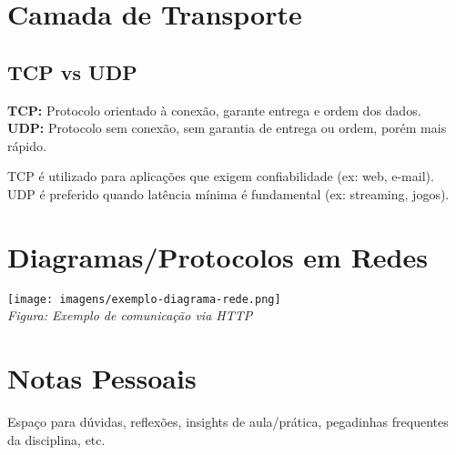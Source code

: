 \section{Camada de Transporte}
\subsection{TCP vs UDP}
\begin{defbox}
\textbf{TCP:} Protocolo orientado à conexão, garante entrega e ordem dos dados.\\
\textbf{UDP:} Protocolo sem conexão, sem garantia de entrega ou ordem, porém mais rápido.
\end{defbox}

\begin{notebox}
TCP é utilizado para aplicações que exigem confiabilidade (ex: web, e-mail). UDP é preferido quando latência mínima é fundamental (ex: streaming, jogos).
\end{notebox}

\section{Diagramas/Protocolos em Redes}
\begin{diagrambox}
\texttt{[image: imagens/exemplo-diagrama-rede.png]}\\
\textit{Figura: Exemplo de comunicação via HTTP}
\end{diagrambox}

\section{Notas Pessoais}
Espaço para dúvidas, reflexões, insights de aula/prática, pegadinhas frequentes da disciplina, etc.
